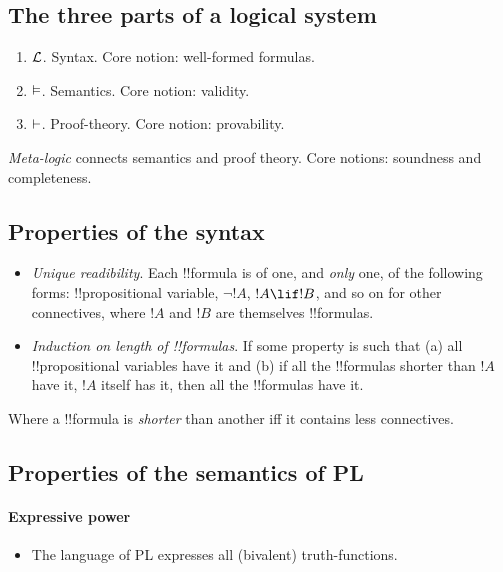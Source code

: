 \documentclass[../../../include/open-logic-section]{subfiles}
\begin{document}


\subsection{The three parts of a logical system}

\begin{enumerate}
	\item $\Lang L$. Syntax. Core notion: well-formed formulas.
	\item $\Entails$. Semantics. Core notion: validity.
	\item $\Proves$. Proof-theory. Core notion: provability.
\end{enumerate}

\emph{Meta-logic} connects semantics and proof theory. Core notions: soundness and completeness.

\subsection{Properties of the syntax}

\begin{itemize}
	\item \emph{Unique readibility}. Each !!{formula} is of one, and \emph{only} one, of the following forms: !!{propositional variable}, $\lnot !A$, $!A \lif !B$, and so on for other connectives, where $!A$ and $!B$ are themselves !!{formula}s.  
	\item \emph{Induction on length of !!{formula}s}. If some property is such that (a) all !!{propositional variable}s have it and (b) if all the !!{formula}s shorter than $!A$ have it, $!A$ itself has it, then all the !!{formula}s have it.
\end{itemize}

Where a !!{formula} is \emph{shorter} than another iff it contains less connectives. 

\subsection{Properties of the semantics of PL}

\paragraph*{Expressive power}

\begin{itemize}
	\item The language of PL expresses all (bivalent) truth-functions.
\end{itemize}
\end{document}
